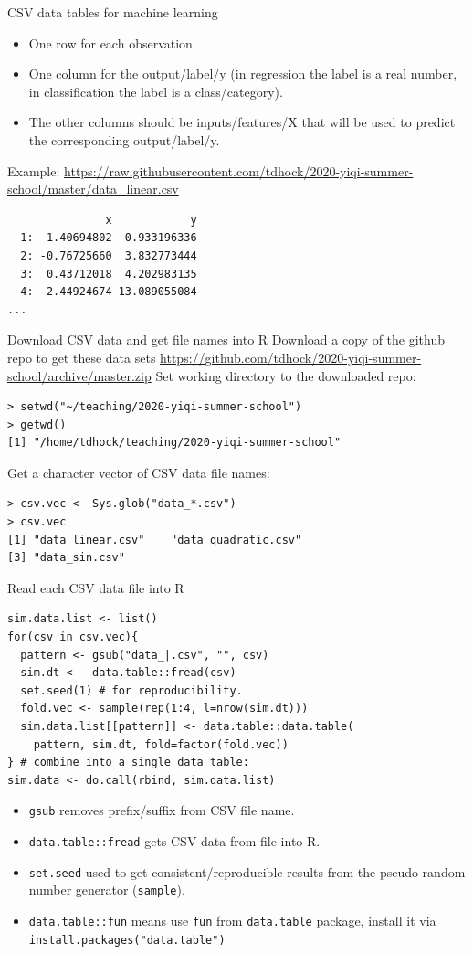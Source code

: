 \documentclass{article}
\begin{document}
{CSV data tables for machine learning}
\begin{itemize}
\item One row for each observation.
\item One column for the output/label/y (in regression the label is a real
  number, in classification the label is a class/category).
\item The other columns should be inputs/features/X that will be used
  to predict the corresponding output/label/y.
\end{itemize}
  Example:
  \url{https://raw.githubusercontent.com/tdhock/2020-yiqi-summer-school/master/data_linear.csv}
\begin{verbatim}
               x            y
  1: -1.40694802  0.933196336
  2: -0.76725660  3.832773444
  3:  0.43712018  4.202983135
  4:  2.44924674 13.089055084
...
\end{verbatim}


{Download CSV data and get file names into R}
Download a copy of the github repo to get these data sets
\url{https://github.com/tdhock/2020-yiqi-summer-school/archive/master.zip}
Set working directory to the downloaded repo:
\begin{verbatim}
> setwd("~/teaching/2020-yiqi-summer-school")
> getwd()
[1] "/home/tdhock/teaching/2020-yiqi-summer-school"
\end{verbatim}
  Get a character vector of CSV data file names:
\begin{verbatim}
> csv.vec <- Sys.glob("data_*.csv")
> csv.vec
[1] "data_linear.csv"    "data_quadratic.csv"
[3] "data_sin.csv"      
\end{verbatim}

{Read each CSV data file into R}
\begin{verbatim}
sim.data.list <- list()
for(csv in csv.vec){
  pattern <- gsub("data_|.csv", "", csv)
  sim.dt <-  data.table::fread(csv)
  set.seed(1) # for reproducibility.
  fold.vec <- sample(rep(1:4, l=nrow(sim.dt)))
  sim.data.list[[pattern]] <- data.table::data.table(
    pattern, sim.dt, fold=factor(fold.vec))
} # combine into a single data table:
sim.data <- do.call(rbind, sim.data.list)
\end{verbatim}
\begin{itemize}
\item \texttt{gsub} removes prefix/suffix from CSV file name.
\item \texttt{data.table::fread} gets CSV data from file into R.
\item \texttt{set.seed} used to get consistent/reproducible results from the
  pseudo-random number generator (\texttt{sample}).
\item \texttt{data.table::fun} means use \texttt{fun} from
  \texttt{data.table} package, install it via
  \texttt{install.packages("data.table")}
\end{itemize}
\end{document}
